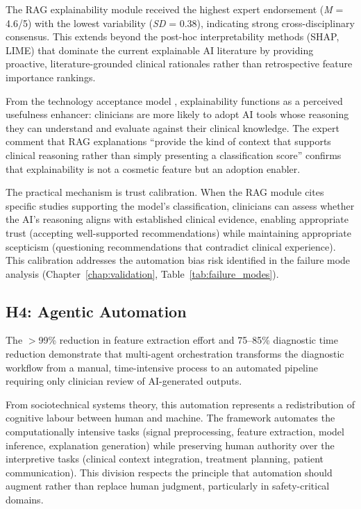 The RAG explainability module received the highest expert endorsement (\textit{M} = 4.6/5) with the lowest variability (\textit{SD} = 0.38), indicating strong cross-disciplinary consensus. This extends beyond the post-hoc interpretability methods (SHAP, LIME) that dominate the current explainable AI literature \citep{arrieta2020xai} by providing proactive, literature-grounded clinical rationales rather than retrospective feature importance rankings.

From the technology acceptance model \citep{davis1989tam}, explainability functions as a perceived usefulness enhancer: clinicians are more likely to adopt AI tools whose reasoning they can understand and evaluate against their clinical knowledge. The expert comment that RAG explanations ``provide the kind of context that supports clinical reasoning rather than simply presenting a classification score'' confirms that explainability is not a cosmetic feature but an adoption enabler.

The practical mechanism is trust calibration. When the RAG module cites specific studies supporting the model's classification, clinicians can assess whether the AI's reasoning aligns with established clinical evidence, enabling appropriate trust (accepting well-supported recommendations) while maintaining appropriate scepticism (questioning recommendations that contradict clinical experience). This calibration addresses the automation bias risk identified in the failure mode analysis (Chapter~\ref{chap:validation}, Table~\ref{tab:failure_modes}).

\subsection{H4: Agentic Automation}

The $>$99\% reduction in feature extraction effort and 75--85\% diagnostic time reduction demonstrate that multi-agent orchestration transforms the diagnostic workflow from a manual, time-intensive process to an automated pipeline requiring only clinician review of AI-generated outputs.

From sociotechnical systems theory, this automation represents a redistribution of cognitive labour between human and machine. The framework automates the computationally intensive tasks (signal preprocessing, feature extraction, model inference, explanation generation) while preserving human authority over the interpretive tasks (clinical context integration, treatment planning, patient communication). This division respects the principle that automation should augment rather than replace human judgment, particularly in safety-critical domains.

